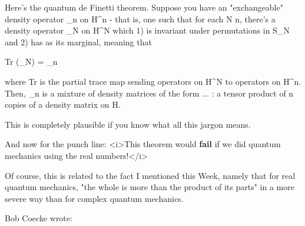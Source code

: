 Here's the quantum de Finetti theorem.  Suppose you have an 
"exchangeable" density operator \rho _{n} 
on H^{\otimes  n} - that is, one such that for each 
N \ge  n, there's a density operator \rho _{N} 
on H^{\otimes  N} which 1) is invariant under permutations 
in S_{N} and 2) has \rho  as its marginal, meaning that

Tr (\rho _{N}) = \rho _{n}  

where Tr is the partial trace map sending operators on 
H^{\otimes  N} to operators on 
H^{\otimes  n}. 
Then, \rho _{n} is a mixture of density matrices of the form 
\rho  \otimes  ... \otimes  \rho : a tensor product of n copies of 
a density matrix on H.

This is completely plausible if you know what all this jargon means.

And now for the punch line: <i>This theorem would \textbf{fail} if we did 
quantum mechanics using the real numbers!</i>

Of course, this is related to the fact I mentioned this Week, 
namely that for real quantum mechanics, "the whole is more 
than the product of its parts" in a more severe way than for 
complex quantum mechanics.

Bob Coecke wrote:

